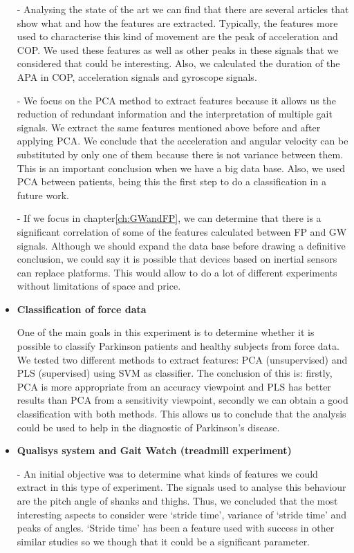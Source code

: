 \begin{itemize}
-	Analysing the state of the art we can find that there are several articles that show what and how the features are extracted. Typically, the features more used to characterise this kind of movement are the peak of acceleration and COP. We used these features  as well as other peaks in these signals that we considered that could be interesting. Also, we calculated the duration of the APA in COP, acceleration signals and gyroscope signals.

-	We focus on the PCA method to extract features because it allows us the reduction of redundant information and the interpretation of multiple gait signals. We extract the same features mentioned above before and after applying PCA. We conclude that the acceleration and angular velocity can be substituted by only one of them because there is not variance between them. This is an important conclusion when we have a big data base. 
Also, we used PCA between patients, being this the first step to do a classification in a future work.

-	If we focus in chapter\ref{ch:GWandFP}, we can determine that there is a significant correlation of some of the features calculated between FP and GW signals. Although  we should expand the data base before drawing a definitive conclusion, we could say it is possible that devices based on inertial sensors can replace platforms. This would allow to do a lot of different experiments without limitations of space and price.

\item \textbf{Classification of force data}

One of the main goals in this experiment is to determine whether it is possible to classify Parkinson patients and healthy subjects from force data. We tested two different methods to extract features: PCA (unsupervised) and PLS (supervised) using SVM as classifier. The conclusion of this is: firstly, PCA is more appropriate from an accuracy viewpoint and PLS has better results than PCA from a sensitivity viewpoint, secondly we can obtain a good classification with both methods. This allows us to conclude that the analysis could be used to help in the diagnostic of Parkinson's disease.

\item \textbf{Qualisys system and Gait Watch (treadmill experiment)}

-	An initial objective was to determine what kinds of features we could extract in this type of experiment. The signals used to analyse this behaviour are the pitch angle of shanks and thighs. Thus, we concluded that the most interesting aspects to consider were ‘stride time’, variance of ‘stride time’  and peaks of angles. ‘Stride time’ has been a feature used with success in other similar studies so we though that it could be a significant parameter.


\end{itemize}
